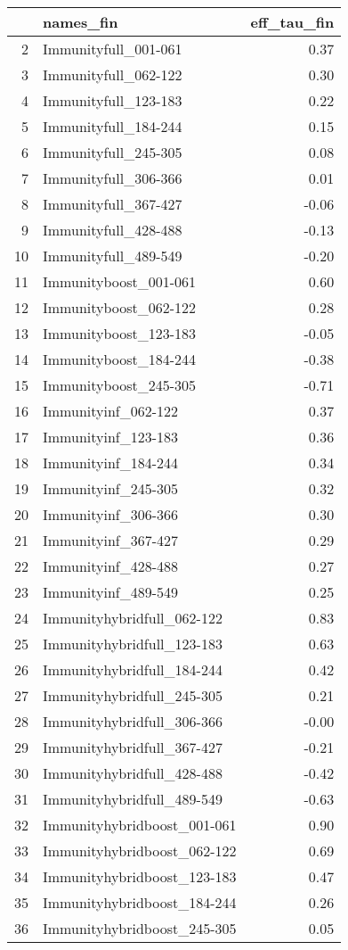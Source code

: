 \begin{table}[ht]
\centering
\begin{tabular}{rlr}
  \hline
 & names\_fin & eff\_tau\_fin \\ 
  \hline
2 & Immunityfull\_001-061 & 0.37 \\ 
  3 & Immunityfull\_062-122 & 0.30 \\ 
  4 & Immunityfull\_123-183 & 0.22 \\ 
  5 & Immunityfull\_184-244 & 0.15 \\ 
  6 & Immunityfull\_245-305 & 0.08 \\ 
  7 & Immunityfull\_306-366 & 0.01 \\ 
  8 & Immunityfull\_367-427 & -0.06 \\ 
  9 & Immunityfull\_428-488 & -0.13 \\ 
  10 & Immunityfull\_489-549 & -0.20 \\ 
  11 & Immunityboost\_001-061 & 0.60 \\ 
  12 & Immunityboost\_062-122 & 0.28 \\ 
  13 & Immunityboost\_123-183 & -0.05 \\ 
  14 & Immunityboost\_184-244 & -0.38 \\ 
  15 & Immunityboost\_245-305 & -0.71 \\ 
  16 & Immunityinf\_062-122 & 0.37 \\ 
  17 & Immunityinf\_123-183 & 0.36 \\ 
  18 & Immunityinf\_184-244 & 0.34 \\ 
  19 & Immunityinf\_245-305 & 0.32 \\ 
  20 & Immunityinf\_306-366 & 0.30 \\ 
  21 & Immunityinf\_367-427 & 0.29 \\ 
  22 & Immunityinf\_428-488 & 0.27 \\ 
  23 & Immunityinf\_489-549 & 0.25 \\ 
  24 & Immunityhybridfull\_062-122 & 0.83 \\ 
  25 & Immunityhybridfull\_123-183 & 0.63 \\ 
  26 & Immunityhybridfull\_184-244 & 0.42 \\ 
  27 & Immunityhybridfull\_245-305 & 0.21 \\ 
  28 & Immunityhybridfull\_306-366 & -0.00 \\ 
  29 & Immunityhybridfull\_367-427 & -0.21 \\ 
  30 & Immunityhybridfull\_428-488 & -0.42 \\ 
  31 & Immunityhybridfull\_489-549 & -0.63 \\ 
  32 & Immunityhybridboost\_001-061 & 0.90 \\ 
  33 & Immunityhybridboost\_062-122 & 0.69 \\ 
  34 & Immunityhybridboost\_123-183 & 0.47 \\ 
  35 & Immunityhybridboost\_184-244 & 0.26 \\ 
  36 & Immunityhybridboost\_245-305 & 0.05 \\ 
   \hline
\end{tabular}
\end{table}
